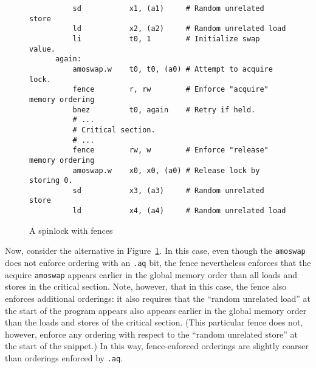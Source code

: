 \begin{figure}[h!]
  \centering\small
  \begin{verbatim}
          sd           x1, (a1)     # Random unrelated store
          ld           x2, (a2)     # Random unrelated load
          li           t0, 1        # Initialize swap value.
      again:
          amoswap.w    t0, t0, (a0) # Attempt to acquire lock.
          fence        r, rw        # Enforce "acquire" memory ordering
          bnez         t0, again    # Retry if held.
          # ...
          # Critical section.
          # ...
          fence        rw, w        # Enforce "release" memory ordering
          amoswap.w    x0, x0, (a0) # Release lock by storing 0.
          sd           x3, (a3)     # Random unrelated store
          ld           x4, (a4)     # Random unrelated load
  \end{verbatim}
  \caption{A spinlock with fences}
  \label{fig:litmus:spinlock_fences}
\end{figure}

Now, consider the alternative in Figure~\ref{fig:litmus:spinlock_fences}.
In this case, even though the {\tt amoswap} does not enforce ordering with an {\tt .aq} bit, the fence nevertheless enforces that the acquire {\tt amoswap} appears earlier in the global memory order than all loads and stores in the critical section.
Note, however, that in this case, the fence also enforces additional orderings: it also requires that the ``random unrelated load'' at the start of the program appears also appears earlier in the global memory order than the loads and stores of the critical section.  (This particular fence does not, however, enforce any ordering with respect to the ``random unrelated store'' at the start of the snippet.)
In this way, fence-enforced orderings are slightly coarser than orderings enforced by {\tt.aq}.

